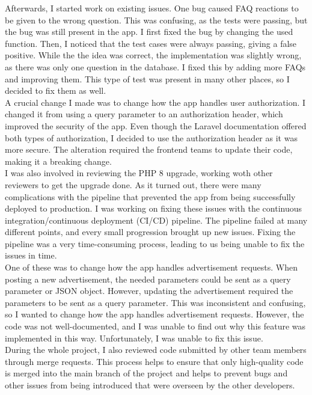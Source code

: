 \documentclass[sf-font,usefira,english]{uulm/sp/article}
\begin{document}
Afterwards, I started work on existing issues. 
One bug caused FAQ reactions to be given to the wrong question. 
This was confusing, as the tests were passing, but the bug was still present in the app. 
I first fixed the bug by changing the used function.
Then, I noticed that the test cases were always passing, giving a false positive.
While the the idea was correct, the implementation was slightly wrong, as there was only one question in the database.
I fixed this by adding more FAQs and improving them.
This type of test was present in many other places, so I decided to fix them as well.\\

A crucial change I made was to change how the app handles user authorization.
I changed it from using a query parameter to an authorization header, which improved the security of the app. 
Even though the Laravel documentation offered both types of authorization, I decided to use the authorization header as it was more secure. 
The alteration required the frontend teams to update their code, making it a breaking change.\\

I was also involved in reviewing the PHP 8 upgrade, working woth other reviewers to get the upgrade done.
As it turned out, there were many complications with the pipeline that prevented the app from being successfully deployed to production. 
I was working on fixing these issues with the continuous integration/continuous deployment (CI/CD) pipeline. 
The pipeline failed at many different points, and every small progression brought up new issues. 
Fixing the pipeline was a very time-consuming process, leading to us being unable to fix the issues in time.\\
 
One of these was to change how the app handles advertisement requests. 
When posting a new advertisement, the needed parameters could be sent as a query parameter or JSON object. 
However, updating the advertisement required the parameters to be sent as a query parameter. 
This was inconsistent and confusing, so I wanted to change how the app handles advertisement requests. 
However, the code was not well-documented, and I was unable to find out why this feature was implemented in this way. 
Unfortunately, I was unable to fix this issue.\\

During the whole project, I also reviewed code submitted by other team members through merge requests. 
This process helps to ensure that only high-quality code is merged into the main branch of the project and helps to prevent bugs and other issues from being introduced that were overseen by the other developers.\\
\end{document}
